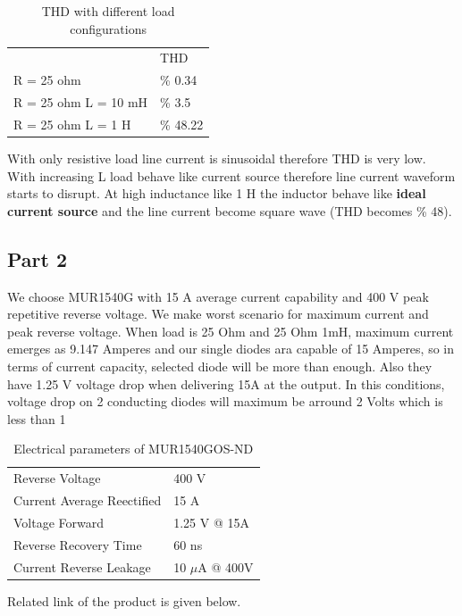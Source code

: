 \documentclass[fleqn, a4paper]{article}
\begin{document}
\begin{table}[H]
\centering
\begin{tabular}{ll}
                      & THD      \\
R = 25 ohm            & \% 0.34  \\
R = 25 ohm L  = 10 mH & \% 3.5   \\
R = 25 ohm L = 1 H    & \% 48.22
\end{tabular}
\caption{THD with different load configurations}
\end{table} 

With only resistive load line current is sinusoidal therefore THD is very low. With increasing L load behave like current source therefore line current waveform starts to disrupt. At high inductance like 1 H the inductor behave like \textbf{ideal current source} and the line current become square wave (THD becomes \% 48). 
\subsection*{Part 2}
We choose MUR1540G with 15 A average current capability and 400 V peak repetitive reverse voltage. We make worst scenario for maximum current and peak reverse voltage. 
When load is 25 Ohm and 25 Ohm 1mH, maximum current emerges as 9.147 Amperes and our single diodes ara capable of 15 Amperes, so in terms of current capacity, selected diode will be more than enough. Also they have 1.25 V voltage drop when delivering 15A at the output. In this conditions, voltage drop on 2 conducting diodes will maximum be arround 2 Volts which is less than 1%

\begin{table}[H]
\centering
\begin{tabular}{ll}

Reverse Voltage                   & 400 V               \\
Current Average Reectified        & 15 A                \\
Voltage Forward                   & 1.25 V @ 15A        \\
Reverse Recovery Time             & 60 ns       	\\
Current Reverse Leakage           & 10 $\mu$A  @ 400V         
\end{tabular}
\caption{Electrical parameters of MUR1540GOS-ND}
\end{table}
Related link of the product is given below.
\end{document}
